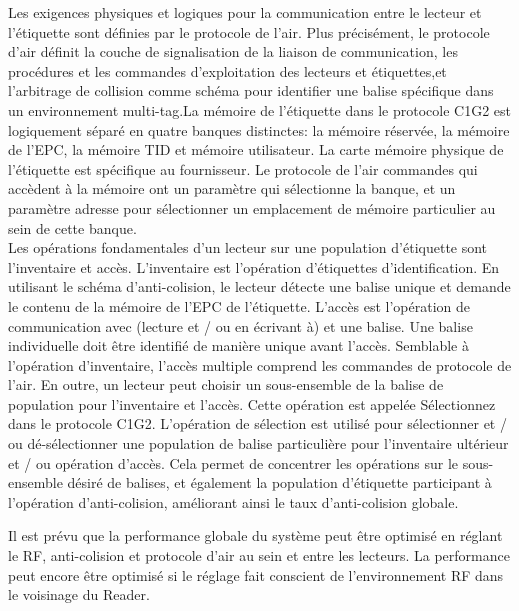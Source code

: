 \documentclass[11pt, a4paper, twoside]{book}
\begin{document}
Les exigences physiques et logiques pour la communication entre le lecteur et l'étiquette  sont définies par le protocole de l'air. Plus précisément, le protocole d'air définit la couche de signalisation de la liaison de communication, les procédures et les commandes d'exploitation des lecteurs et étiquettes,et l'arbitrage de collision comme schéma pour identifier une balise spécifique  dans un environnement multi-tag.La mémoire de l'étiquette dans le protocole C1G2 est logiquement  séparé en quatre banques distinctes: la mémoire réservée, la mémoire de l'EPC, la mémoire TID et mémoire utilisateur. La carte mémoire physique de l'étiquette est spécifique au fournisseur. Le protocole de l'air commandes qui accèdent à la mémoire ont un paramètre qui sélectionne la banque, et un paramètre adresse pour sélectionner un emplacement de mémoire particulier au sein de cette banque.\\


Les opérations fondamentales d'un lecteur sur une population d'étiquette sont l'inventaire et accès. L'inventaire est l'opération d'étiquettes d'identification. En utilisant le schéma d'anti-colision, le lecteur détecte une balise unique et demande le contenu de la mémoire de l'EPC de l'étiquette. L'accès est l'opération de  communication avec (lecture et / ou en écrivant à) et une balise. Une balise individuelle doit être identifié de manière unique avant l'accès. Semblable à l'opération d'inventaire, l'accès multiple comprend les commandes de protocole de l'air. En outre, un lecteur peut choisir un sous-ensemble de la balise de population pour l'inventaire et l'accès. Cette opération est appelée Sélectionnez dans le protocole C1G2. L'opération de sélection est utilisé pour sélectionner et / ou dé-sélectionner une population de balise particulière pour l'inventaire ultérieur et / ou opération d'accès. Cela permet de concentrer les opérations sur le sous-ensemble désiré de balises, et également la population d'étiquette participant à l'opération  d'anti-colision, améliorant ainsi le taux d'anti-colision globale.

Il est prévu que la performance globale du système peut être optimisé en réglant le RF, anti-colision et protocole d'air  au sein et entre les lecteurs. La performance peut encore être optimisé si le réglage fait conscient de l'environnement RF dans le voisinage du Reader.\\
\end{document}
